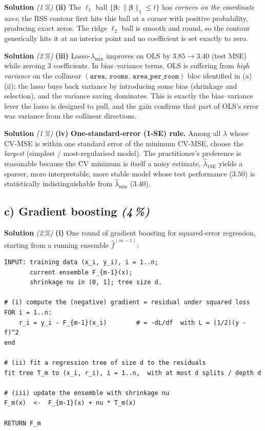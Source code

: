 \documentclass[11pt,a4paper]{article}
\newcommand{\subpoints}[1]{\textit{(#1\,\%)}}
\newcommand{\sol}{\noindent\textbf{Solution}}
\begin{document}
\medskip
\sol{} \subpoints{1} \textbf{(ii)} The $\ell_1$ ball $\{\boldsymbol\beta : \|\boldsymbol\beta\|_1 \leq t\}$
has \emph{corners on the coordinate axes}; the RSS contour first hits this ball at a corner with
positive probability, producing exact zeros. The ridge $\ell_2$ ball is smooth and round, so the
contour generically hits it at an interior point and no coefficient is set exactly to zero.

\medskip
\sol{} \subpoints{2} \textbf{(iii)} Lasso-$\hat\lambda_{\min}$ improves on OLS by $3.85 \to 3.40$
(test MSE) while zeroing $3$ coefficients. In bias--variance terms, OLS is suffering from
\emph{high variance} on the collinear $(\texttt{area},\,\texttt{rooms},\,\texttt{area\_per\_room})$
bloc identified in (a)(ii); the lasso buys back variance by introducing some bias (shrinkage and
selection), and the variance saving dominates. This is exactly the bias--variance lever the lasso
is designed to pull, and the gain confirms that part of OLS's error was variance from the
collinear directions.

\medskip
\sol{} \subpoints{1} \textbf{(iv)} \textbf{One-standard-error (1-SE) rule.} Among all $\lambda$
whose CV-MSE is within one standard error of the minimum CV-MSE, choose the \emph{largest}
(simplest / most-regularised model). The practitioner's preference is reasonable because the CV
minimum is itself a noisy estimate, $\hat\lambda_{1\text{SE}}$ yields a sparser, more
interpretable, more stable model whose test performance ($3.50$) is statistically
indistinguishable from $\hat\lambda_{\min}$ ($3.40$).

\subsection*{c) Gradient boosting \subpoints{4}}

\sol{} \subpoints{2} \textbf{(i)} One round of gradient boosting for squared-error regression,
starting from a running ensemble $\hat f^{(m-1)}$:

{\small
\begin{verbatim}
INPUT: training data (x_i, y_i), i = 1..n;
       current ensemble F_{m-1}(x);
       shrinkage nu in (0, 1]; tree size d.

# (i) compute the (negative) gradient = residual under squared loss
FOR i = 1..n:
    r_i = y_i - F_{m-1}(x_i)        # = -dL/df  with L = (1/2)(y - f)^2
end

# (ii) fit a regression tree of size d to the residuals
fit tree T_m to (x_i, r_i), i = 1..n,  with at most d splits / depth d

# (iii) update the ensemble with shrinkage nu
F_m(x)  <-  F_{m-1}(x) + nu * T_m(x)

RETURN F_m
\end{verbatim}
}
\end{document}
